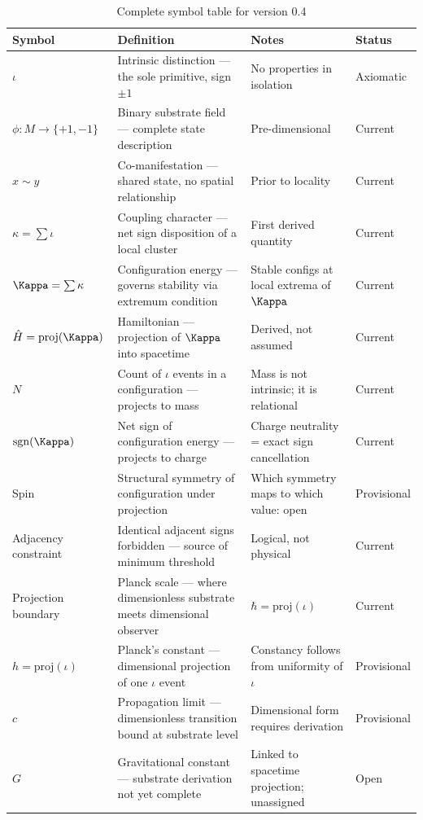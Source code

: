 \documentclass[11pt,letterpaper]{article}
\begin{document}
\begin{table}[htbp]
\caption{Complete symbol table for version 0.4}
\centering
\begin{tabular}{llp{4.5cm}l}
\toprule
\textbf{Symbol} & \textbf{Definition} & \textbf{Notes} & \textbf{Status}\\
\midrule
\(\iota\) & Intrinsic distinction --- the sole primitive, sign \(\pm 1\) & No properties in isolation & Axiomatic\\
\(\phi : M \to \{+1,-1\}\) & Binary substrate field --- complete state description & Pre-dimensional & Current\\
\(x \sim y\) & Co-manifestation --- shared state, no spatial relationship & Prior to locality & Current\\
\(\kappa = \sum \iota\) & Coupling character --- net sign disposition of a local cluster & First derived quantity & Current\\
\(\Kappa = \sum \kappa\) & Configuration energy --- governs stability via extremum condition & Stable configs at local extrema of \(\Kappa\) & Current\\
\(\hat{H} = \mathrm{proj}(\Kappa)\) & Hamiltonian --- projection of \(\Kappa\) into spacetime & Derived, not assumed & Current\\
\(N\) & Count of \(\iota\) events in a configuration --- projects to mass & Mass is not intrinsic; it is relational & Current\\
\(\mathrm{sgn}(\Kappa)\) & Net sign of configuration energy --- projects to charge & Charge neutrality = exact sign cancellation & Current\\
Spin & Structural symmetry of configuration under projection & Which symmetry maps to which value: open & Provisional\\
Adjacency constraint & Identical adjacent signs forbidden --- source of minimum threshold & Logical, not physical & Current\\
Projection boundary & Planck scale --- where dimensionless substrate meets dimensional observer & \(\hbar = \mathrm{proj}(\iota)\) & Current\\
\(h = \mathrm{proj}(\iota)\) & Planck's constant --- dimensional projection of one \(\iota\) event & Constancy follows from uniformity of \(\iota\) & Provisional\\
\(c\) & Propagation limit --- dimensionless transition bound at substrate level & Dimensional form requires derivation & Provisional\\
\(G\) & Gravitational constant --- substrate derivation not yet complete & Linked to spacetime projection; unassigned & Open\\

\end{tabular}
\end{table}
\end{document}
